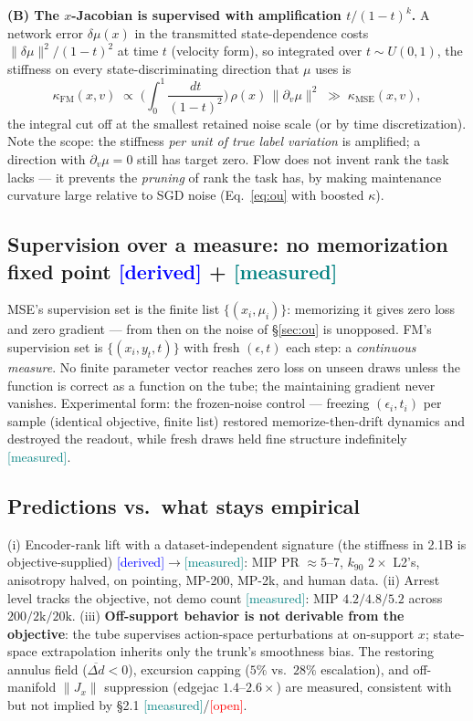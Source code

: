\documentclass[10pt]{article}
\newcommand{\tagd}{{\small\textcolor{blue}{[derived]}}}
\newcommand{\tagm}{{\small\textcolor{teal}{[measured]}}}
\newcommand{\tago}{{\small\textcolor{red}{[open]}}}
\begin{document}
\textbf{(B) The $x$-Jacobian is supervised with amplification
$t/(1-t)^{k}$.} A network error $\delta\mu(x)$ in the transmitted
state-dependence costs $\|\delta\mu\|^{2}/(1-t)^{2}$ at time $t$ (velocity
form), so integrated over $t\sim U(0,1)$, the stiffness on every
state-discriminating direction that $\mu$ uses is
\begin{equation}
\kappa_{\mathrm{FM}}(x,v) \;\propto\;
\Big(\int_0^{1}\!\frac{dt}{(1-t)^{2}}\Big)\,\rho(x)\,\|\partial_v\mu\|^{2}
\;\gg\; \kappa_{\mathrm{MSE}}(x,v),
\end{equation}
the integral cut off at the smallest retained noise scale (or by time
discretization). Note the scope: the stiffness \emph{per unit of true label
variation} is amplified; a direction with $\partial_v\mu=0$ still has target
zero. Flow does not invent rank the task lacks --- it prevents the
\emph{pruning} of rank the task has, by making maintenance curvature large
relative to SGD noise (Eq.~\eqref{eq:ou} with boosted $\kappa$).

\subsection{Supervision over a measure: no memorization fixed point
\hfill \tagd{} + \tagm}
MSE's supervision set is the finite list $\{(x_i,\mu_i)\}$: memorizing it
gives zero loss and zero gradient --- from then on the noise of
\S\ref{sec:ou} is unopposed. FM's supervision set is
$\{(x_i, y_t, t)\}$ with fresh $(\epsilon,t)$ each step: a \emph{continuous
measure}. No finite parameter vector reaches zero loss on unseen draws unless
the function is correct as a function on the tube; the maintaining gradient
never vanishes. Experimental form: the frozen-noise control --- freezing
$(\epsilon_i,t_i)$ per sample (identical objective, finite list) restored
memorize-then-drift dynamics and destroyed the readout, while fresh draws held
fine structure indefinitely \tagm.

\subsection{Predictions vs.\ what stays empirical}
(i) Encoder-rank lift with a dataset-independent signature (the stiffness in
2.1B is objective-supplied) \tagd$\to$\tagm: MIP PR $\approx 5$--$7$, $k_{90}$
$2\times$ L2's, anisotropy halved, on pointing, MP-200, MP-2k, and human
data. (ii) Arrest level tracks the objective, not demo count \tagm: MIP
$4.2/4.8/5.2$ across $200/2\mathrm{k}/20\mathrm{k}$. (iii) \textbf{Off-support
behavior is not derivable from the objective}: the tube supervises
action-space perturbations at on-support $x$; state-space extrapolation
inherits only the trunk's smoothness bias. The restoring annulus field
($\overline{\Delta d}<0$), excursion capping ($5\%$ vs.\ $28\%$ escalation),
and off-manifold $\|J_x\|$ suppression (edgejac $1.4$--$2.6\times$) are
measured, consistent with but not implied by \S2.1 \tagm/\tago.
\end{document}

